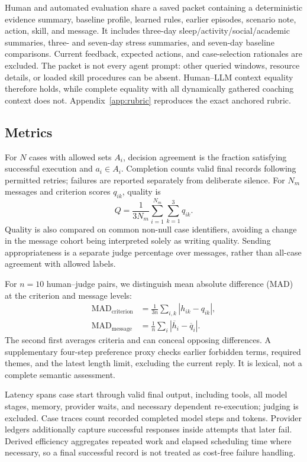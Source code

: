 \documentclass{article}
\begin{document}
Human and automated evaluation share a saved packet containing a deterministic evidence summary, baseline profile, learned rules, earlier episodes, scenario note, action, skill, and message. It includes three-day sleep/activity/social/academic summaries, three- and seven-day stress summaries, and seven-day baseline comparisons. Current feedback, expected actions, and case-selection rationales are excluded. The packet is not every agent prompt: other queried windows, resource details, or loaded skill procedures can be absent. Human--LLM context equality therefore holds, while complete equality with all dynamically gathered coaching context does not. Appendix~\ref{app:rubric} reproduces the exact anchored rubric.

\subsection{Metrics}\label{sec:metrics}
For $N$ cases with allowed sets $A_i$, decision agreement is the fraction satisfying successful execution and $a_i\in A_i$. Completion counts valid final records following permitted retries; failures are reported separately from deliberate silence. For $N_m$ messages and criterion scores $q_{ik}$, quality is
\begin{equation}
Q=\frac{1}{3N_m}\sum_{i=1}^{N_m}\sum_{k=1}^{3}q_{ik}.
\end{equation}
Quality is also compared on common non-null case identifiers, avoiding a change in the message cohort being interpreted solely as writing quality. Sending appropriateness is a separate judge percentage over messages, rather than all-case agreement with allowed labels.

For $n=10$ human--judge pairs, we distinguish mean absolute difference (MAD) at the criterion and message levels:
\begin{align}
\mathrm{MAD}_{\mathrm{criterion}}&=\frac{1}{3n}\sum_{i,k}|h_{ik}-q_{ik}|,\\
\mathrm{MAD}_{\mathrm{message}}&=\frac{1}{n}\sum_i|\overline h_i-\overline q_i|.
\end{align}
The second first averages criteria and can conceal opposing differences. A supplementary four-step preference proxy checks earlier forbidden terms, required themes, and the latest length limit, excluding the current reply. It is lexical, not a complete semantic assessment.

Latency spans case start through valid final output, including tools, all model stages, memory, provider waits, and necessary dependent re-execution; judging is excluded. Case traces count recorded completed model steps and tokens. Provider ledgers additionally capture successful responses inside attempts that later fail. Derived efficiency aggregates repeated work and elapsed scheduling time where necessary, so a final successful record is not treated as cost-free failure handling.
\end{document}

